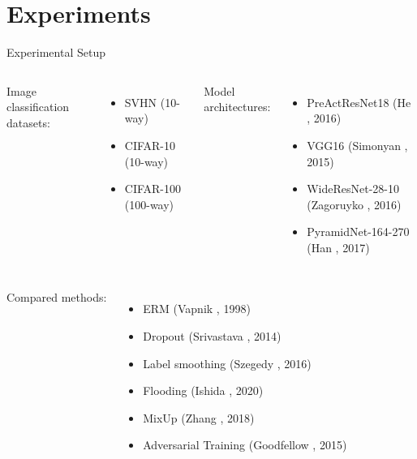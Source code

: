 \section{Experiments}


\begin{frame}{Experimental Setup}

\begin{columns}
Image classification datasets:
\begin{itemize}
    \item SVHN (10-way)
    \item CIFAR-10 (10-way)
    \item CIFAR-100 (100-way)
\end{itemize}


Model architectures:
\begin{itemize}
    \item PreActResNet18 (He \etal, 2016)
    \item VGG16 (Simonyan \etal, 2015)
    \item WideResNet-28-10 (Zagoruyko \etal, 2016)
    \item PyramidNet-164-270 (Han \etal, 2017)
\end{itemize}
\end{columns}

\begin{columns}
Compared methods:
\begin{itemize}
    \item ERM (Vapnik \etal, 1998)
    \item Dropout (Srivastava \etal, 2014)
    \item Label smoothing (Szegedy \etal, 2016)
    \item Flooding (Ishida \etal, 2020)
    \item MixUp (Zhang \etal, 2018)
    \item Adversarial Training (Goodfellow \etal, 2015)
\end{itemize}
\end{columns}

\end{frame}


